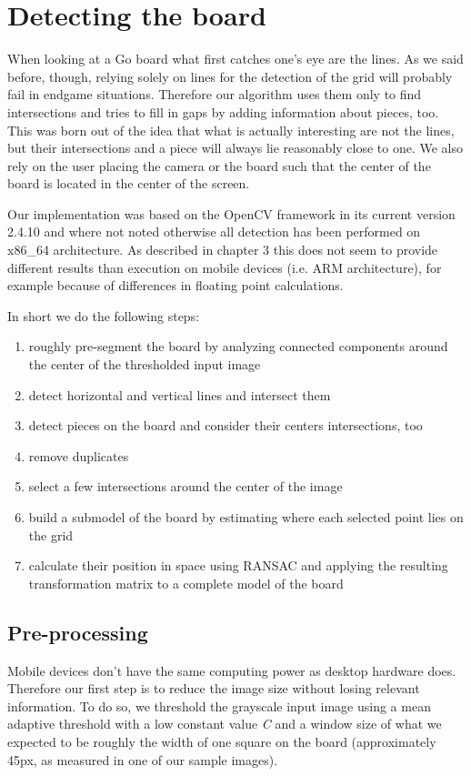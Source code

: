 
\chapter{Detecting the board}
	When looking at a Go board what first catches one's eye are the lines. As we said before, though, relying solely on lines for the detection of the grid will probably fail in endgame situations. Therefore our algorithm uses them only to find intersections and tries to fill in gaps by adding information about pieces, too. This was born out of the idea that what is actually interesting are not the lines, but their intersections and a piece will always lie reasonably close to one. We also rely on the user placing the camera or the board such that the center of the board is located in the center of the screen.

	Our implementation was based on the OpenCV framework in its current version 2.4.10 and where not noted otherwise all detection has been performed on x86\_64 architecture. As described in chapter 3 this does not seem to provide different results than execution on mobile devices (i.e. ARM architecture), for example because of differences in floating point calculations.

	In short we do the following steps:
	\begin{enumerate}
		\item roughly pre-segment the board by analyzing connected components around the center of the thresholded input image
		\item detect horizontal and vertical lines and intersect them
		\item detect pieces on the board and consider their centers intersections, too
		\item remove duplicates
		\item select a few intersections around the center of the image
		\item build a submodel of the board by estimating where each selected point lies on the grid
		\item calculate their position in space using RANSAC and applying the resulting transformation matrix to a complete model of the board
	\end{enumerate}

	\section{Pre-processing}
	Mobile devices don't have the same computing power as desktop hardware does. Therefore our first step is to reduce the image size without losing relevant information. To do so, we threshold the grayscale input image using a mean adaptive threshold with a low constant value \emph{C} and a window size of what we expected to be roughly the width of one square on the board (approximately 45px, as measured in one of our sample images).

